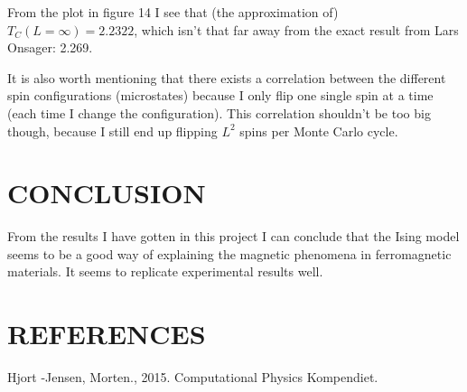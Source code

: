 \documentclass[twocolumn]{article}
\begin{document}
From the plot in figure 14 I see that (the approximation of) $T_C(L=\infty) = 2.2322$, which isn't that far away from the exact result from Lars Onsager: 2.269.\newline

It is also worth mentioning that there exists a correlation between the different spin configurations (microstates) because I only flip one single spin at a time (each time I change the configuration). This correlation shouldn't be too big though, because I still end up flipping $L^2$ spins per Monte Carlo cycle.\newline

\section{CONCLUSION}
From the results I have gotten in this project I can conclude that the Ising model seems to be a good way of explaining the magnetic phenomena in ferromagnetic materials. It seems to replicate experimental results well. 

\section{REFERENCES}
Hjort -Jensen, Morten., 2015. Computational Physics Kompendiet.
\end{document}
